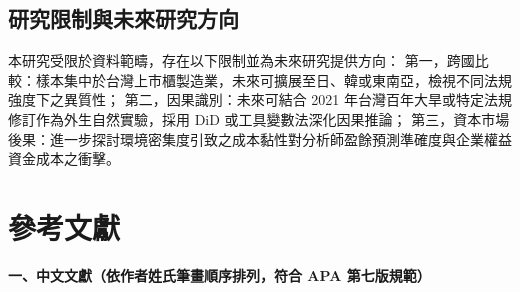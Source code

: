 \documentclass[12pt,a4paper]{article}
\begin{document}
\subsection{研究限制與未來研究方向}

本研究受限於資料範疇，存在以下限制並為未來研究提供方向：
第一，跨國比較：樣本集中於台灣上市櫃製造業，未來可擴展至日、韓或東南亞，檢視不同法規強度下之異質性；
第二，因果識別：未來可結合 2021 年台灣百年大旱或特定法規修訂作為外生自然實驗，採用 DiD 或工具變數法深化因果推論；
第三，資本市場後果：進一步探討環境密集度引致之成本黏性對分析師盈餘預測準確度與企業權益資金成本之衝擊。

\newpage

\section*{參考文獻}

\noindent \textbf{一、中文文獻（依作者姓氏筆畫順序排列，符合 APA 第七版規範）}
\end{document}
